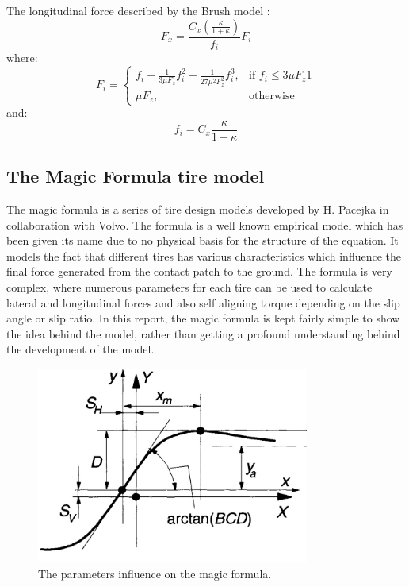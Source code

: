 The longitudinal force described by the Brush model \cite{pacejka}:
\begin{equation}
	F_{x} = \frac{C_{x}(\frac{\kappa}{1+\kappa})}{f_{i}}F_{i}
\end{equation}
where:
\begin{equation}
F_{i}= 
\begin{cases}
f_{i}-\frac{1}{3\mu F_{z}}f_{i}^{2}+\frac{1}{27\mu^{2}F_{z}^{2}}f_{i}^{3}, & \text{if } f_{i} \leq 3\mu F_{z} 1\\
\mu F_{z}, & \text{otherwise}
\end{cases}
\end{equation}
and:
\begin{equation}
	f_{i} = C_{x}\frac{\kappa}{1+\kappa}
\end{equation}

\subsection{The Magic Formula tire model}
The magic formula is a series of tire design models developed by H. Pacejka \cite{pacejka} in collaboration with Volvo. The formula is a well known empirical model which has been given its name due to no physical basis for the structure of the equation. It models the fact that different tires has various characteristics which influence the final force generated from the contact patch to the ground. The formula is very complex, where numerous parameters for each tire can be used to calculate lateral and longitudinal forces and also self aligning torque depending on the slip angle or slip ratio. In this report, the magic formula is kept fairly simple to show the idea behind the model, rather than getting a profound understanding behind the development of the model.


\begin{figure}[h]
	\centering
	\includegraphics[width=0.8\textwidth]{Pictures/magic_formula}
	\caption{The parameters influence on the magic formula. \cite{pacejka}}
	\label{magic_formula}
\end{figure}

